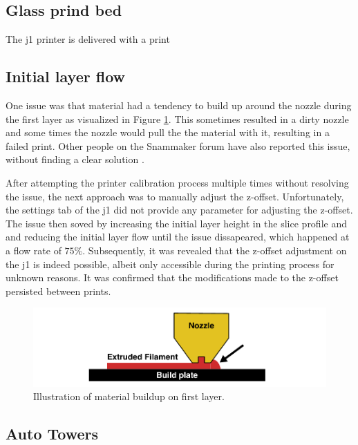 \subsection{Glass prind bed}
The \gls{j1} printer is delivered with a print


\subsection{Initial layer flow}
One issue was that material had a tendency to build up around the nozzle during the first layer as visualized in Figure \ref{fig:first_layer_buildup}.
This sometimes resulted in a dirty nozzle and some times the nozzle would pull the the material with it, resulting in a failed print.
Other people on the Snammaker forum have also reported this issue, without finding a clear solution \cite{artezioFinerAdjustmentsOffset2021} \cite{napsZHeightCalibrationOffset2023}.

After attempting the printer calibration process multiple times without resolving the issue, the next approach was to manually adjust the z-offset.
Unfortunately, the settings tab of the \gls{j1} did not provide any parameter for adjusting the z-offset.
The issue then soved by increasing the initial layer height in the slice profile and and reducing the initial layer flow until the issue dissapeared, which happened at a flow rate of $75\%$.
Subsequently, it was revealed that the z-offset adjustment on the \gls{j1} is indeed possible, albeit only accessible during the printing process for unknown reasons.
It was confirmed that the modifications made to the z-offset persisted between prints.



\begin{figure}[H]
    \centering
    \includegraphics[width=\textwidth]{figures/3d_print/first_layer_buildup.pdf}
    \caption{Illustration of material buildup on first layer.}
    \label{fig:first_layer_buildup}
\end{figure}


\subsection{Auto Towers}
\cite{kartchnerAutoTowersGeneratorUltimaker2022}